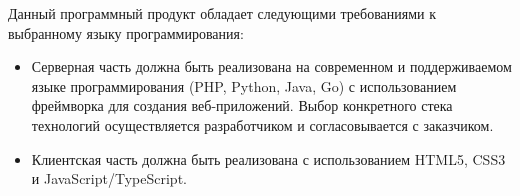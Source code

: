
Данный программный продукт обладает следующими требованиями к выбранному языку программирования:
\begin{itemize}
    \item Серверная часть должна быть реализована на современном и поддерживаемом языке программирования (PHP, Python, Java, Go) с использованием фреймворка для создания веб-приложений. Выбор конкретного стека технологий осуществляется разработчиком и согласовывается с заказчиком.
    \item Клиентская часть должна быть реализована с использованием HTML5, CSS3 и JavaScript/TypeScript.
\end{itemize}